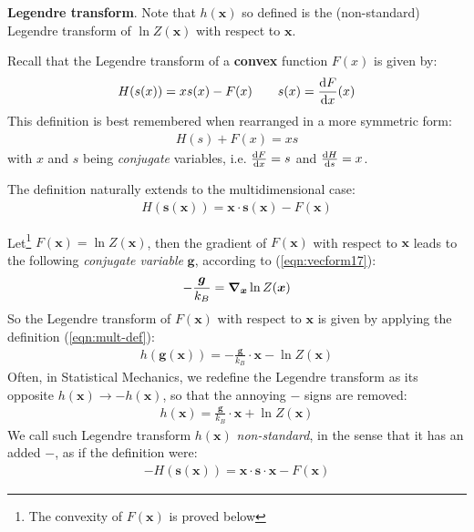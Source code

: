 \documentclass[../template.tex]{subfiles}
\begin{document}
\begin{appr}
    \textbf{Legendre transform}. Note that $h(\bm{x})$ so defined is the (non-standard) Legendre transform of $\ln Z(\bm{x})$ with respect to $\bm{x}$.
    
    \medskip

    Recall that the Legendre transform of a \textbf{convex}  function $F(x)$ is given by:
    \begin{align*}
        H(s(x)) = x s(x) -F(x) \qquad s(x) = {\dv{F}{x}}(x)
    \end{align*}
    This definition is best remembered when rearranged in a more symmetric form:
    \begin{align*}
        H(s) + F(x) = xs
    \end{align*}
    with $x$ and $s$ being \textit{conjugate} variables, i.e. $\dv{F}{x} = s$ and $\dv{H}{s} = x$.
    
    \medskip

    The definition naturally extends to the multidimensional case:
    \begin{align}\label{eqn:mult-def}
        H(\bm{s}(\bm{x})) = \bm{x} \cdot \bm{s}(\bm{x}) - F(\bm{x}) 
    \end{align}

    Let\footnote{The convexity of $F(\bm{x})$ is proved below} $F(\bm{x}) = \ln Z(\bm{x})$, then the gradient of $F(\bm{x})$ with respect to $\bm{x}$ leads to the following \textit{conjugate variable} $\bm{g}$, according to (\ref{eqn:vecform17}):
    \begin{align*}
        -\frac{\bm{g}}{k_B} = \grad_{\bm{x}} \ln Z(\bm{x})
    \end{align*} 
    So the Legendre transform of $F(\bm{x})$ with respect to $\bm{x}$ is given by applying the definition (\ref{eqn:mult-def}):
    \begin{align*}
        h(\bm{g}(\bm{x})) = -\frac{\bm{g}}{k_B} \cdot \bm{x} - \ln Z(\bm{x}) 
    \end{align*}
    Often, in Statistical Mechanics, we redefine the Legendre transform as its opposite $h(\bm{x}) \to -h(\bm{x})$, so that the annoying $-$ signs are removed:
    \begin{align*}
        h(\bm{x}) = \frac{\bm{g}}{k_B} \cdot \bm{x} + \ln Z(\bm{x})
    \end{align*}
    We call such Legendre transform $h(\bm{x})$ \textit{non-standard}, in the sense that it has an added $-$, as if the definition were:
    \begin{align*}
        -H(\bm{s}(\bm{x})) = \bm{x} \cdot \bm{s} \cdot \bm{x} - F(\bm{x})
    \end{align*} 
\end{appr}
\end{document}

